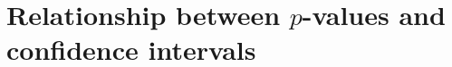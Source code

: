 \documentclass[]{report}\usepackage[]{graphicx}\usepackage[]{color}
\begin{document}
\section{Relationship between $p$-values and confidence intervals}
%
%
%
\end{document}
